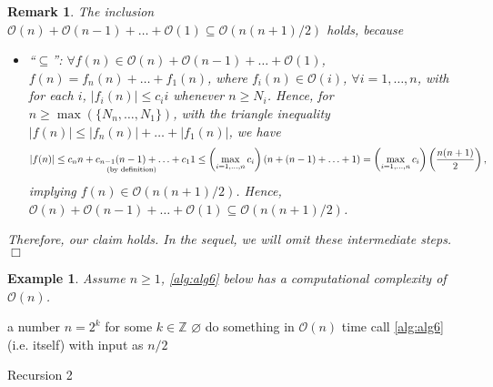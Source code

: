 \documentclass[twoside]{article}
\newcommand{\qedwhite}{\hfill \ensuremath{\Box}}
\newcommand{\abs}[1]{\left\lvert#1\right\rvert}
\newtheorem{remark}[theorem]{Remark}
\newtheorem{example}[theorem]{Example}
\begin{document}
\begin{remark}\normalfont
    The inclusion $\mathcal{O}(n)+\mathcal{O}(n-1)+\ldots+\mathcal{O}(1)\subseteq\mathcal{O}(n(n+1)/2)$ holds, because
    \begin{itemize}[leftmargin=*]
        \item ``$\subseteq$'': $\forall f(n)\in\mathcal{O}(n)+\mathcal{O}(n-1)+\ldots+\mathcal{O}(1)$, $f(n)=f_{n}(n)+\ldots+f_{1}(n)$, where $f_{i}(n)\in\mathcal{O}(i)$, $\forall i=1,\ldots,n$, with for each $i$, $\abs{f_{i}(n)}\leq c_{i}i$ whenever $n\geq N_{i}$. Hence, for $n\geq\max(\{N_{n},\ldots,N_{1}\})$, with the triangle inequality $\abs{f(n)}\leq \abs{f_{n}(n)}+\ldots+\abs{f_{1}(n)}$, we have
        \begin{equation*}
        \abs{f(n)}\leq \underset{{\text{\normalfont (by definition)}}}{c_{n}n+c_{n-1}(n-1)+\ldots+c_{1}1}\leq \left(\max_{i=1,\ldots,n}c_{i}\right)\left(n+\left(n-1\right)+\ldots+1\right)=\left(\max_{i=1,\ldots,n}c_{i}\right)\left(\frac{n(n+1)}{2}\right),
        \end{equation*}
        implying $f(n)\in\mathcal{O}(n(n+1)/2)$. Hence, $\mathcal{O}(n)+\mathcal{O}(n-1)+\ldots+\mathcal{O}(1)\subseteq\mathcal{O}(n(n+1)/2)$.
        
    \end{itemize}
    Therefore, our claim holds. In the sequel, we will omit these intermediate steps.\qedwhite
\end{remark}
\begin{example}\normalfont
    Assume $n\geq 1$, \autoref{alg:alg6} below has a computational complexity of $\mathcal{O}(n)$.
\end{example}
    
\begin{algorithm}[!ht]
\begin{algorithmic}[1]
\REQUIRE a number $n=2^{k}$ for some $k\in\mathbb{Z}$
\ENSURE $\varnothing$
\STATE do something in $\mathcal{O}(n)$ time 
\STATE call \autoref{alg:alg6} (i.e. itself) with input as {\color{blue} $n/2$}
\ENDIF
\end{algorithmic}
\caption{Recursion 2}
\label{alg:alg6}
\end{algorithm}
\end{document}
